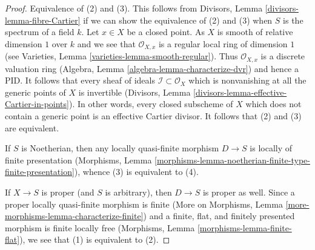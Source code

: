 \documentclass[10pt,a4paper]{amsart}
\theoremstyle{plain}
\theoremstyle{definition}
\theoremstyle{remark}
\numberwithin{equation}{subsection}
\begin{document}
\begin{proof}
Equivalence of (2) and (3). This follows from
Divisors, Lemma \ref{divisors-lemma-fibre-Cartier}
if we can show the equivalence of (2) and (3) when
$S$ is the spectrum of a field $k$. Let $x \in X$ be a closed point.
As $X$ is smooth of relative dimension $1$ over $k$ and we see that
$\mathcal{O}_{X, x}$ is a regular local ring of dimension $1$
(see Varieties, Lemma \ref{varieties-lemma-smooth-regular}).
Thus $\mathcal{O}_{X, x}$ is a discrete valuation ring
(Algebra, Lemma \ref{algebra-lemma-characterize-dvr})
and hence a PID. It follows that every sheaf of ideals
$\mathcal{I} \subset \mathcal{O}_X$ which is nonvanishing at all
the generic points of $X$ is invertible
(Divisors, Lemma \ref{divisors-lemma-effective-Cartier-in-points}).
In other words, every closed subscheme of $X$ which does not contain
a generic point is an effective Cartier divisor.
It follows that (2) and (3) are equivalent.

\medskip\noindent
If $S$ is Noetherian, then any locally quasi-finite morphism
$D \to S$ is locally of finite presentation (Morphisms, Lemma
\ref{morphisms-lemma-noetherian-finite-type-finite-presentation}),
whence (3) is equivalent to (4).

\medskip\noindent
If $X \to S$ is proper (and $S$ is arbitrary), then $D \to S$ is
proper as well. Since a proper locally quasi-finite morphism is finite
(More on Morphisms, Lemma \ref{more-morphisms-lemma-characterize-finite})
and a finite, flat, and finitely presented morphism is finite locally free
(Morphisms, Lemma \ref{morphisms-lemma-finite-flat}), we see that
(1) is equivalent to (2).
\end{proof}
\end{document}
